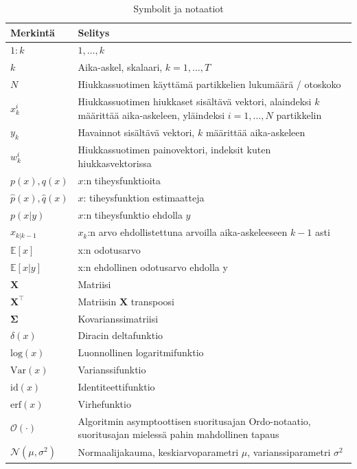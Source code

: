 \documentclass[
  12pt,
  a4paper, twoside]{book}
\begin{document}
\begin{table}

\caption{\label{tab:notaatiot}Symbolit ja notaatiot}
\centering
\begin{tabular}[t]{ll}
\toprule
Merkintä & Selitys\\
\midrule
$1:k$ & $1,\ldots,k$\\
$k$ & Aika-askel, skalaari, $k={1,\ldots,T}$\\
$N$ & Hiukkassuotimen käyttämä partikkelien lukumäärä / otoskoko\\
$x^i_k$ & \makecell[l]{Hiukkassuotimen hiukkaset sisältävä vektori,\\alaindeksi $k$ määrittää aika-askeleen,\\yläindeksi $i={1,\ldots,N}$ partikkelin}\\
$y_k$ & Havainnot sisältävä vektori, $k$ määrittää aika-askeleen\\
\addlinespace
$w^i_k$ & Hiukkassuotimen painovektori, indeksit kuten hiukkasvektorissa\\
$p(x), q(x)$ & $x$:n tiheysfunktioita\\
$\hat{p}(x), \hat{q}(x)$ & $x$: tiheysfunktion estimaatteja\\
$p(x|y)$ & $x$:n tiheysfunktio ehdolla $y$\\
$x_{k|k-1}$ & $x_k$:n arvo ehdollistettuna arvoilla aika-askeleeseen $k-1$ asti\\
\addlinespace
$\mathbb{E}[x]$ & x:n odotusarvo\\
$\mathbb{E}[x|y]$ & x:n ehdollinen odotusarvo ehdolla y\\
$\mathbf{X}$ & Matriisi\\
$\mathbf{X}^\top$ & Matriisin $\mathbf{X}$ transpoosi\\
$\mathbf{\Sigma}$ & Kovarianssimatriisi\\
\addlinespace
$\delta(x)$ & Diracin deltafunktio\\
$\text{log}(x)$ & Luonnollinen logaritmifunktio\\
$\text{Var}(x)$ & Varianssifunktio\\
$\text{id}(x)$ & Identiteettifunktio\\
$\text{erf}(x)$ & Virhefunktio\\
\addlinespace
$\mathcal{O}(\cdot)$ & \makecell[l]{Algoritmin asymptoottisen suoritusajan Ordo-notaatio,\\suoritusajan mielessä pahin mahdollinen tapaus}\\
$\mathcal{N}(\mu, \sigma^2)$ & Normaalijakauma, keskiarvoparametri $\mu$, varianssiparametri $\sigma^2$\\

\end{tabular}
\end{table}
\end{document}
